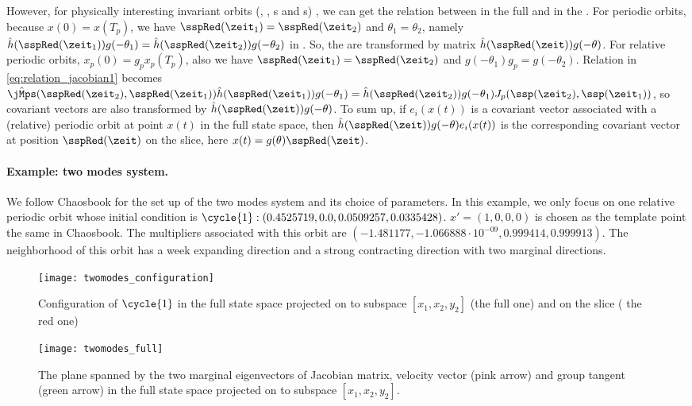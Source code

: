 However, for physically interesting invariant orbits (\eqva, \reqva, \po s and \rpo s) , we can
get the relation between
{\cLvs} in the full {\statesp} and in the {\slice}.
For periodic orbits, because $x(0)=x(T_{p})$, we have
$\sspRed(\zeit_1)=\sspRed(\zeit_2)$ and $\theta_{1}=\theta_{2}$, namely
$\hat{h}(\sspRed(\zeit_1))g(-\theta_{1})=
\hat{h}(\sspRed(\zeit_2))g(-\theta_{2})$ in .
So, the {\cLvs} are transformed by matrix
$\hat{h}(\sspRed(\zeit))g(-\theta)$. For relative periodic orbits,
$x_{p}(0)=g_{p}x_{p}(T_{p})$, also we have
$\sspRed(\zeit_1)=\sspRed(\zeit_2)$ and $g(-\theta_{1})g_{p}=g(-\theta_{2})$.
Relation in \eqref{eq:relation_jacobian1} becomes
$\hat{\jMps}(\sspRed(\zeit_2),\sspRed(\zeit_1))\hat{h}
(\sspRed(\zeit_1))g(-\theta_{1})
=\hat{h}(\sspRed(\zeit_2))g(-\theta_{1})J_{p}(\ssp(\zeit_2),\ssp(\zeit_1))$,
so covariant vectors are also transformed by
$\hat{h}(\sspRed(\zeit))g(-\theta)$. To sum up, if $e_{i}(x(t))$ is a
covariant vector associated with a (relative) periodic orbit at
point $x(t)$ in the full
state space, then $\hat{h}(\sspRed(\zeit))g(-\theta)e_{i}(x(t))$ is
the corresponding covariant vector at position $\sspRed(\zeit)$ on the
slice, here $x(t)=g(\theta)\sspRed(\zeit)$.

\paragraph{Example: two modes system.}
We follow Chaosbook for the set up of the two modes system and its choice of
parameters. In this example, we only focus on one relative periodic orbit
whose initial condition is $\cycle{1}: (0.4525719, 0.0, 0.0509257,
0.0335428)$. $x'=(1,0,0,0)$ is chosen as the template point the same in
Chaosbook. The multipliers associated with this orbit are
$(-1.481177, -1.066888\cdot 10^{-09}, 0.999414, 0.999913)$. The
neighborhood of this orbit has a week expanding direction and a strong
contracting direction with two marginal directions.

\begin{figure}[h]
  \centering
  \texttt{[image: twomodes\_configuration]}
  \caption{Configuration of $\cycle{1}$ in the full state space projected
    on to subspace $[x_{1},x_{2},y_{2}]$ (the full one) and on the slice (
    the red one)
  }
  \label{fig:twomodes_configuration}
\end{figure}

\begin{figure}[h]
  \centering
  \texttt{[image: twomodes\_full]}
  \caption{The plane spanned by the two marginal eigenvectors of Jacobian
    matrix,
    velocity vector (pink arrow) and group tangent (green arrow)
    in the full state space projected on
    to subspace $[x_{1},x_{2},y_{2}]$.}
  \label{fig:twomodes_full}
\end{figure}

